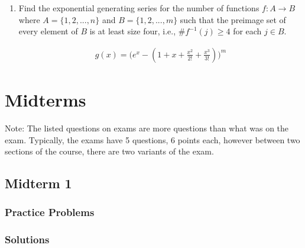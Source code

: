 \documentclass{report}
\begin{document}
{\begin{enumerate}
          Similarly, let $B$ be the set of the chosen $r$ elements and the ways they can be placed into $n$ different boxes. This is clearly represented by the generating series

          \begin{align*}
              g_2(x) = \frac{1}{(1-x)}
          \end{align*}

          Clearly, $S = A \star B$ which is the star product and thus, we can clearly see that the number of ways to choose a subset of $r$ and distribute $r$ elements into $n$ boxes is counted by $S$ which has a generating series:

          \begin{align*}
              g(x) = \frac{e^x}{(1-x)^n}
          \end{align*}

    \item Find the exponential generating series for the number of functions $f:A\to B$ where $A=\{1,2,...,n\}$ and $B=\{1,2,...,m\}$ such that the preimage set of every element of $B$ is at least size four, i.e., $\#f^{-1}(j)\geq 4$ for each $j\in B$.

          \begin{align*}
              g(x) = \Big ( e^x - (1 + x + \frac{x^2}{2!} + \frac{x^3}{3!}) \Big )^m
          \end{align*}
\end{enumerate}

\chapter{Midterms}

Note: The listed questions on exams are more questions than what was
on the exam. Typically, the exams have 5 questions, 6 points each, however
between two sections of the course, there are two variants of the exam.

\section*{Midterm 1}

\subsection*{Practice Problems}

\subsection*{Solutions}

}
\end{document}

